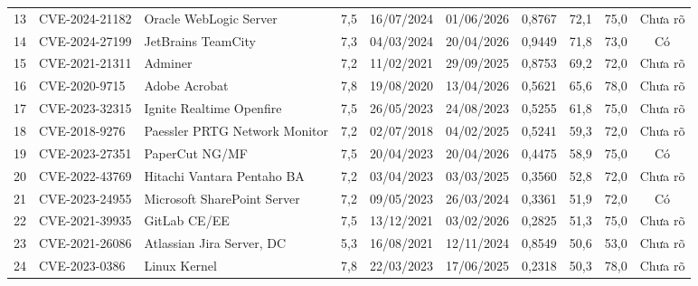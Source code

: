 \documentclass[conference]{IEEEtran}
\begin{document}
\begin{table}[t]
\begin{tabular}{r l >{\raggedright\arraybackslash}p{4.2cm} c c c c c c c}
13 & CVE-2024-21182 & Oracle WebLogic Server & 7,5 & 16/07/2024 & 01/06/2026 & 0,8767 & 72,1 & 75,0 & Chưa rõ \\
14 & CVE-2024-27199 & JetBrains TeamCity & 7,3 & 04/03/2024 & 20/04/2026 & 0,9449 & 71,8 & 73,0 & Có \\
15 & CVE-2021-21311 & Adminer & 7,2 & 11/02/2021 & 29/09/2025 & 0,8753 & 69,2 & 72,0 & Chưa rõ \\
16 & CVE-2020-9715 & Adobe Acrobat & 7,8 & 19/08/2020 & 13/04/2026 & 0,5621 & 65,6 & 78,0 & Chưa rõ \\
17 & CVE-2023-32315 & Ignite Realtime Openfire & 7,5 & 26/05/2023 & 24/08/2023 & 0,5255 & 61,8 & 75,0 & Chưa rõ \\
18 & CVE-2018-9276 & Paessler PRTG Network Monitor & 7,2 & 02/07/2018 & 04/02/2025 & 0,5241 & 59,3 & 72,0 & Chưa rõ \\
19 & CVE-2023-27351 & PaperCut NG/MF & 7,5 & 20/04/2023 & 20/04/2026 & 0,4475 & 58,9 & 75,0 & Có \\
20 & CVE-2022-43769 & Hitachi Vantara Pentaho BA & 7,2 & 03/04/2023 & 03/03/2025 & 0,3560 & 52,8 & 72,0 & Chưa rõ \\
21 & CVE-2023-24955 & Microsoft SharePoint Server & 7,2 & 09/05/2023 & 26/03/2024 & 0,3361 & 51,9 & 72,0 & Có \\
22 & CVE-2021-39935 & GitLab CE/EE & 7,5 & 13/12/2021 & 03/02/2026 & 0,2825 & 51,3 & 75,0 & Chưa rõ \\
23 & CVE-2021-26086 & Atlassian Jira Server, DC & 5,3 & 16/08/2021 & 12/11/2024 & 0,8549 & 50,6 & 53,0 & Chưa rõ \\
24 & CVE-2023-0386 & Linux Kernel & 7,8 & 22/03/2023 & 17/06/2025 & 0,2318 & 50,3 & 78,0 & Chưa rõ \\
\bottomrule
\end{tabular}
\end{table}
\end{document}
